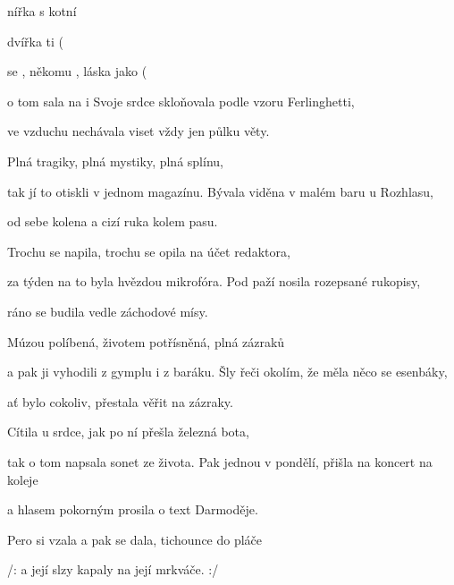 
\zs
{} nířka s   kotní   

  dvířka  ti
\ifdefined\TPBAND
(
\fi

 se , někomu ,
láska jako 
\ifdefined\TPBAND
(
\fi

 o tom sala  na i 
    
\ks
\zs
Svoje srdce skloňovala podle vzoru Ferlinghetti,

ve vzduchu nechávala viset vždy jen půlku věty.

Plná tragiky, plná mystiky,
plná splínu,

tak jí to otiskli v jednom magazínu.
\ks
\zs
Bývala viděna v malém baru u Rozhlasu,

od sebe kolena a cizí ruka kolem pasu.

Trochu se napila, trochu se opila
na účet redaktora,

za týden na to byla hvězdou mikrofóra.
\ks
\zs
Pod paží nosila rozepsané rukopisy,

ráno se budila vedle záchodové mísy.

Múzou políbená, životem potřísněná,
plná zázraků

a pak ji vyhodili z gymplu i z baráku.
\ks
\zs
Šly řeči okolím, že měla něco se esenbáky,

ať bylo cokoliv, přestala věřit na zázraky.

Cítila u srdce, jak po ní přešla
železná bota,

tak o tom napsala sonet ze života.
\ks
\zs
Pak jednou v pondělí, přišla na koncert na koleje

a hlasem pokorným prosila o text Darmoděje.

Pero si vzala a pak se dala,
tichounce do pláče

/: a její slzy kapaly na její mrkváče. :/
\ks
\kp





